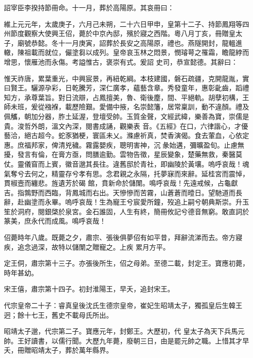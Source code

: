 \begin{pinyinscope}
 詔宰臣李揆持節冊命。十一月，葬於高陽原。其哀冊曰：



 維上元元年，太歲庚子，六月己未朔，二十六日甲申，皇第十二子、持節鳳翔等四州節度觀察大使興王佋，薨於中京內邸，殯於寢之西階。粵八月丁亥，冊贈皇太子，廟號恭懿。冬十一月庚寅，詔葬於長安之高陽原，禮也。燕隧開封，龍轀進轍，陳祖載而就位，儼塗芻以成列。皇帝哀玉林之悶景，憫璿萼之罹霜，瞻龍綍而增思，懷雁池而永傷。考謚惟古，褒崇有式。爰詔
 史司，恭宣懿德。其辭曰：



 惟天祚唐，累葉重光，中興宸景，再紐乾綱。本枝建國，磐石疏疆，克開龍胤，實曰賢王。驪源孕彩，日乾騰芳，深仁廣孝，蘊藝含章。秀發童年，惠彰齔齒，蹈禮知方，承尊葉旨。對日流辯，占鳳擅美，魯、衛後塵，間、平絕軌。胡孽初構，王師未班，爰從襁褓，載歷險艱。愛備中掖，名崇懿籓，居常稟訓，動不違顏。禮及佩觿，朝加分器，胙土延渥，登壇受帥。玉質金聲，文經武緯，樂善為寶，崇儒是貴。浚哲外朗，溫文內深，閱書成誦，觀樂表
 音。《五經》在口，六律諧心，才優藝洽，絕古超今。蛇豕猶梗，寰區未乂。滌慮祈真，焚香演偈。食去葷血，心依定惠。庶福邦家，俾清兇穢。霧露嬰疾，聰明害神，沉彖始遘，彌曠盈旬。止慮無擾，發言有倫，在膏方亟，問膳逾勤。雲物告徵，星辰變象，楚藥無救，秦醫莫仗。靈儀窅而上賓，徽音邈其長往。違舊邸於青社，即幽陵於黃壤。嗚呼哀哉！魂氣奪兮去何之，精靈存兮孝有思。念君親之永隔，托夢寐而來辭。延桂宮而震悼，貫椒壼而纏悲。旌遺芳於碣
 館，賁新命於儲闈。鳴呼哀哉！先遠戒候，占龜獻吉。指鶉野而西臨，背鳳城而右出。天慘慘而苦霧，山蒼蒼而曀日。望馳道而長辭，赴幽塗而永畢。嗚呼哀哉！生為寵王兮宸愛所鐘，歿追上嗣兮朝典斯崇。升玉笙於洞府，閱銀棨於泉宮。金石誰固，人生有終，簡冊攸記兮德音無窮。敢直詞於篆美，庶永代而成風。鳴呼哀哉！



 佋薨時年八歲。既薨之夕，肅宗、張後俱夢佋有如平昔，拜辭流涕而去。帝方寢疾，追念過深，故特以儲闈之贈寵之。上疾
 累月方平。



 定王侗，肅宗第十三子。亦張後所生，佋之母弟。至德二載，封定王。寶應初薨，時年甚幼。



 宋王僖，肅宗第十四子。初封淮陽王，早夭，追封宋王。



 代宗皇帝二十子：睿真皇後沈氏生德宗皇帝，崔妃生昭靖太子，獨孤皇后生韓王迥；餘十七王，舊史不載母氏所出。



 昭靖太子邈，代宗第二子。寶應元年，封鄭王。大歷初，代
 皇太子為天下兵馬元帥。王好讀書，以儒行聞。大歷九年薨，廢朝三日，由是罷元帥之職。上惜其才早夭，冊贈昭靖太子，葬於萬年縣界。




\end{pinyinscope}
